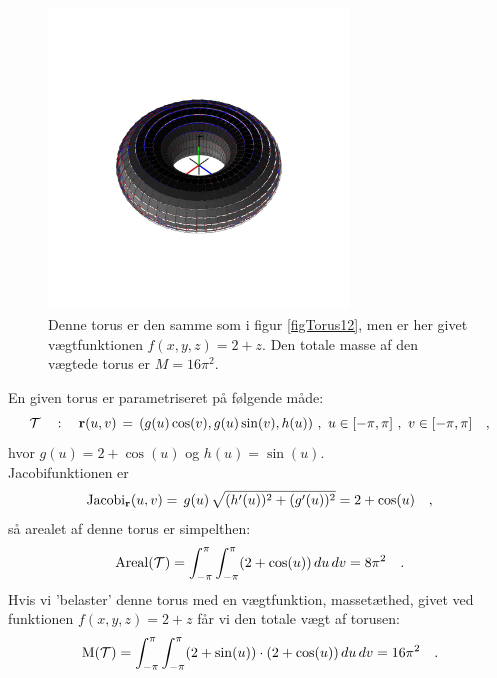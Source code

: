 \begin{figure}[h]
\centerline{\includegraphics[height=80mm]{FIGS/plotTorusWeight3}}
\begin{center}
\caption{\small{Denne {torus} er den samme som i figur \ref{figTorus12}, men er her givet vægtfunktionen $f(x,y,z)= 2+z$. Den totale masse af den vægtede torus er $M= 16\pi^{2}$.}} \label{figTorusWeight3}
\end{center}
\end{figure}



\begin{example}\label{exampTorusArea}
En given torus er parametriseret på følgende måde:
\begin{equation}
\mathcal{T} \quad : \quad {\bf r}(u, v)
\, = \, (g(u)\cos(v), g(u)\sin(v), h(u)) \,\,,
\,\, u \in [-\pi, \pi ]\,\, , \, \, v \in [-\pi,
\pi] \quad ,
\end{equation}
hvor $g(u) = 2 + \cos(u)$ og $h(u) =
\sin(u)$. \\

Jacobifunktionen er
\begin{equation}
\operatorname{Jacobi}_{\mathbf{r}}(u,v)  = \,
g(u)\,\sqrt{(h'(u))^{2} + (g'(u))^{2}} = 2 + \cos(u) \quad,
\end{equation}
så arealet af denne torus er simpelthen:
\begin{equation}
\operatorname{Areal}(\mathcal{T}) = \int_{-\pi}^{\pi} \int_{-\pi}^{\pi} (2 + \cos(u))\, du \, dv = 8\pi^{2} \quad.
\end{equation}
Hvis vi 'belaster' denne torus med en vægtfunktion, massetæthed, givet ved funktionen $f(x,y,z)=2 + z$ får vi den totale vægt af torusen:
\begin{equation}
\operatorname{M}(\mathcal{T}) =  \int_{-\pi}^{\pi} \int_{-\pi}^{\pi} (2 + \sin(u))\cdot(2 + \cos(u))\, du \, dv = 16\pi^{2} \quad.
\end{equation}
\end{example}






